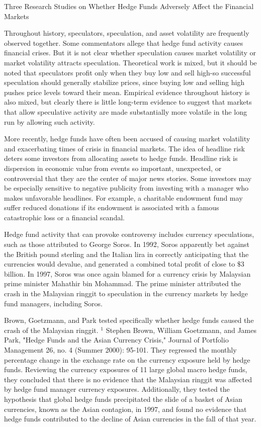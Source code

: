 \documentclass[11pt]{article}
\begin{document}
Three Research Studies on Whether Hedge Funds Adversely Affect the Financial Markets

Throughout history, speculators, speculation, and asset volatility are frequently observed together. Some commentators allege that hedge fund activity causes financial crises. But it is not clear whether speculation causes market volatility or market volatility attracts speculation. Theoretical work is mixed, but it should be noted that speculators profit only when they buy low and sell high-so successful speculation should generally stabilize prices, since buying low and selling high pushes price levels toward their mean. Empirical evidence throughout history is also mixed, but clearly there is little long-term evidence to suggest that markets that allow speculative activity are made substantially more volatile in the long run by allowing such activity.

More recently, hedge funds have often been accused of causing market volatility and exacerbating times of crisis in financial markets. The idea of headline risk deters some investors from allocating assets to hedge funds. Headline risk is dispersion in economic value from events so important, unexpected, or controversial that they are the center of major news stories. Some investors may be especially sensitive to negative publicity from investing with a manager who makes unfavorable headlines. For example, a charitable endowment fund may suffer reduced donations if its endowment is associated with a famous catastrophic loss or a financial scandal.

Hedge fund activity that can provoke controversy includes currency speculations, such as those attributed to George Soros. In 1992, Soros apparently bet against the British pound sterling and the Italian lira in correctly anticipating that the currencies would devalue, and generated a combined total profit of close to $\$ 3$ billion. In 1997, Soros was once again blamed for a currency crisis by Malaysian prime minister Mahathir bin Mohammad. The prime minister attributed the crash in the Malaysian ringgit to speculation in the currency markets by hedge fund managers, including Soros.

Brown, Goetzmann, and Park tested specifically whether hedge funds caused the crash of the Malaysian ringgit. ${ }^{1}$ Stephen Brown, William Goetzmann, and James Park, "Hedge Funds and the Asian Currency Crisis," Journal of Portfolio Management 26, no. 4 (Summer 2000): 95-101. They regressed the monthly percentage change in the exchange rate on the currency exposure held by hedge funds. Reviewing the currency exposures of 11 large global macro hedge funds, they concluded that there is no evidence that the Malaysian ringgit was affected by hedge fund manager currency exposures. Additionally, they tested the hypothesis that global hedge funds precipitated the slide of a basket of Asian currencies, known as the Asian contagion, in 1997, and found no evidence that hedge funds contributed to the decline of Asian currencies in the fall of that year.
\end{document}
